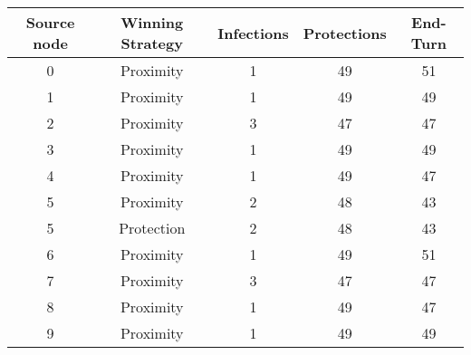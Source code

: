 \documentclass[results.tex]{subfiles}
\begin{document}
    \begin{center}
        \begin{tabular}{| c || c | c | c | c |}
            \hline
            {\bfseries Source node} & {\bfseries Winning Strategy} & {\bfseries Infections} & {\bfseries Protections}
            & {\bfseries End-Turn}
            \\  %
            \hline\hline
            0                       & Proximity                    & 1                      & 49                      & 51                   \\
            \hline
            1                       & Proximity                    & 1                      & 49                      & 49                   \\
            \hline
            2                       & Proximity                    & 3                      & 47                      & 47                   \\
            \hline
            3                       & Proximity                    & 1                      & 49                      & 49                   \\
            \hline
            4                       & Proximity                    & 1                      & 49                      & 47                   \\
            \hline
            5                       & Proximity                    & 2                      & 48                      & 43                   \\
            \hline
            5                       & Protection                   & 2                      & 48                      & 43                   \\
            \hline
            6                       & Proximity                    & 1                      & 49                      & 51                   \\
            \hline
            7                       & Proximity                    & 3                      & 47                      & 47                   \\
            \hline
            8                       & Proximity                    & 1                      & 49                      & 47                   \\
            \hline
            9                       & Proximity                    & 1                      & 49                      & 49                   \\

\end{tabular}
\end{center}
\end{document}
